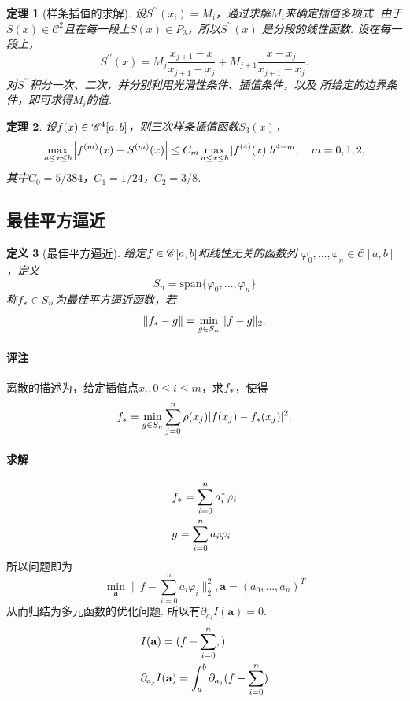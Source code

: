 \documentclass[12pt, a4paper]{article}
\theoremstyle{margin}
\newtheorem{thm}{定理}
\newtheorem{defi}[thm]{定义}
\newcommand{\pr}{\prime}
\newcommand{\ms}{\mathscr}
\newcommand{\mbf}{\mathbf}
\newcommand{\f}{\mathnormal{f}}
\newcommand{\g}{\mathnormal{g}}
\newcommand{\remark}{\paragraph{评注}}
\begin{document}
  \begin{thm}[样条插值的求解]
    设$S^{\pr\pr}(x_i) = M_i$，通过求解$M_i$来确定插值多项式.
    由于$S(x)\in\ms{C}^2$且在每一段上$S(x)\in P_3$，所以$S^{\pr\pr}(x)$
    是分段的线性函数. 设在每一段上，
    \[
      S^{\pr\pr}(x) = M_j\frac{x_{j+1}-x}{x_{j+1}-x_j}
      + M_{j+1}\frac{x-x_j}{x_{j+1}-x_j}.
    \]
    对$S^{\pr\pr}$积分一次、二次，并分别利用光滑性条件、插值条件，以及
    所给定的边界条件，即可求得$M_i$的值.
  \end{thm}

  \begin{thm}
    设$\f(x)\in\ms{C}^4[a, b]$，则三次样条插值函数$S_3(x)$，
    \[
      \max_{a\le x\le b}\left| \f^{(m)}(x) - S^{(m)}(x) \right|
      \le C_m \max_{a\le x\le b}|\f^{(4)}(x)|h^{4-m},\quad
      m=0,1,2,
    \]
    其中$C_0 = 5/384$，$C_1 = 1/24$，$C_2 = 3/8$.
  \end{thm}

\subsection{最佳平方逼近}
  \begin{defi}[最佳平方逼近]
    给定$\f\in\ms{C}[a, b]$和线性无关的函数列
    $\varphi_0, \dots,\varphi_n\in\ms{C}[a, b]$，定义
    \[
      S_n = \text{span}\{\varphi_0, \dots, \varphi_n\}
    \]
    称$\f_*\in S_n$为最佳平方逼近函数，若
    \[
      \|\f_*-\g\| = \min_{\g\in S_n}\|f-g\|_2.
    \]
  \end{defi}
  \remark
    离散的描述为，给定插值点$x_i, 0 \le i\le m$，求$\f_*$，使得
    \[
      \f_*  = \min_{\g\in S_n} \sum_{j=0}^n \rho(x_j)|\f(x_j) - \f_*(x_j)|^2.
    \]

  \paragraph{求解}
    \[\begin{split}
      & \f_* = \sum_{i=0}^n a^*_i\varphi_i \\
      & \g = \sum_{i=0}^na_i\varphi_i
    \end{split}\]
    所以问题即为
    \[
      \min_{\mbf{a}} \|f - \sum_{i=0}^na_i\varphi_i\|_2^2,
      \mbf{a} = (a_0,\dots,a_n)^T
    \]
    从而归结为多元函数的优化问题. 所以有$\partial_{a_i}I(\mbf{a}) = 0.$
    \[\begin{split}
      & I(\mbf{a}) = (f-\sum_{i=0}^n,) \\
      & \partial_{a_j}I(\mbf{a}) = \int_a^b\partial_{a_j}
      (\f-\sum_{i=0}^n)
    \end{split}\]
\end{document}
